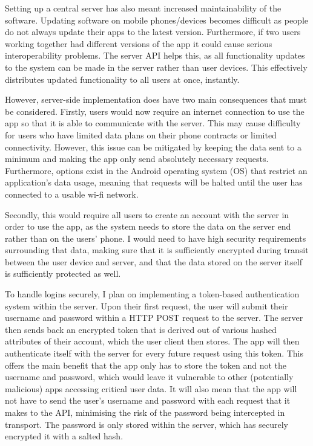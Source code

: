 Setting up a central server has also meant increased maintainability of the software. 
Updating software on mobile phones/devices becomes difficult as people do not always update their apps to the latest version. 
Furthermore, if two users working together had different versions of the app it could cause serious interoperability problems.
The server API helps this, as all functionality updates to the system can be made in the server rather than user devices. This effectively distributes updated functionality to all users at once, instantly.

However, server-side implementation does have two main consequences that must be considered. 
Firstly, users would now require an internet connection to use the app so that it is able to communicate with the server.
This may cause difficulty for users who have limited data plans on their phone contracts or limited connectivity. 
However, this issue can be mitigated by keeping the data sent to a minimum and making the app only send absolutely necessary requests.
Furthermore, options exist in the Android operating system (OS) that restrict an application's data usage, meaning that requests will be halted until the user has connected to a usable wi-fi network.

Secondly, this would require all users to create an account with the server in order to use the app, as the system needs to store the data on the server end rather than on the users' phone.
I would need to have high security requirements surrounding that data, making sure that it is sufficiently encrypted during transit between the user device and server, and that the data stored on the server itself is sufficiently protected as well.

To handle logins securely, I plan on implementing a token-based authentication system within the server. 
Upon their first request, the user will submit their username and password within a HTTP POST request to the server.
The server then sends back an encrypted token that is derived out of various hashed attributes of their account, which the user client then stores.
The app will then authenticate itself with the server for every future request using this token.
This offers the main benefit that the app only has to store the token and not the username and password, which would leave it vulnerable to other (potentially malicious) apps accessing critical user data.
It will also mean that the app will not have to send the user's username and password with each request that it makes to the API, minimising the risk of the password being intercepted in transport.
The password is only stored within the server, which has securely encrypted it with a salted hash.

